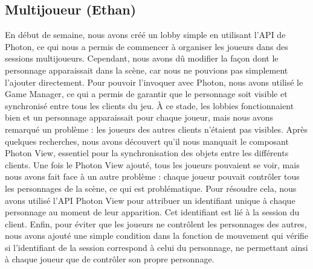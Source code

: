 \documentclass{report}
\begin{document}
\newpage %

\subsection*{Multijoueur (Ethan)}
En début de semaine, nous avons créé un lobby simple en utilisant l'API de Photon, ce qui nous a permis de commencer à organiser les joueurs dans des sessions multijoueurs. Cependant, nous avons dû modifier la façon dont le personnage apparaissait dans la scène, car nous ne pouvions pas simplement l'ajouter directement. Pour pouvoir l'invoquer avec Photon, nous avons utilisé le Game Manager, ce qui a permis de garantir que le personnage soit visible et synchronisé entre tous les clients du jeu. À ce stade, les lobbies fonctionnaient bien et un personnage apparaissait pour chaque joueur, mais nous avons remarqué un problème : les joueurs des autres clients n'étaient pas visibles. Après quelques recherches, nous avons découvert qu'il nous manquait le composant Photon View, essentiel pour la synchronisation des objets entre les différents clients. Une fois le Photon View ajouté, tous les joueurs pouvaient se voir, mais nous avons fait face à un autre problème : chaque joueur pouvait contrôler tous les personnages de la scène, ce qui est problématique. Pour résoudre cela, nous avons utilisé l'API Photon View pour attribuer un identifiant unique à chaque personnage au moment de leur apparition. Cet identifiant est lié à la session du client. Enfin, pour éviter que les joueurs ne contrôlent les personnages des autres, nous avons ajouté une simple condition dans la fonction de mouvement qui vérifie si l'identifiant de la session correspond à celui du personnage, ne permettant ainsi à chaque joueur que de contrôler son propre personnage.
\end{document}
